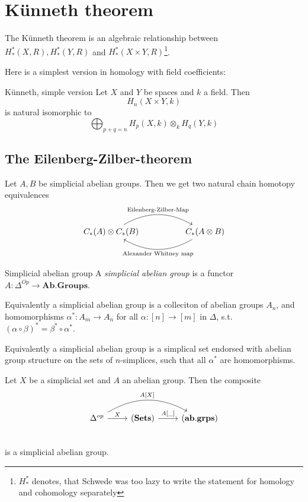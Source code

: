 \documentclass[language=english]{TemplateLecture}
\begin{document}
\section{Künneth theorem}
The Künneth theorem is an algebraic relationship between \(H^*_*(X,R), H^*_*(Y,R)\) and \(H^*_*(X\times Y, R)\)\footnote{\(H_*^*\) denotes, that Schwede was too lazy to write the statement for homology and cohomology separately}.

Here is a simplest version in homology with field coefficients:
\begin{thm}{Künneth, simple version}{}
    Let \(X\) and \(Y\) be spaces and \(k\) a field. Then
    \[H_n(X\times Y, k)\]
    is natural isomorphic to
    \[\bigoplus_{p+q = n} H_p(X,k) \otimes_k H_q(Y,k)\]
\end{thm}

\subsection{The Eilenberg-Zilber-theorem}

Let \(A,B\) be simplicial abelian groups. Then we get two natural chain homotopy equivalences
\[\begin{tikzcd}
    C_*(A) \otimes C_*(B) \ar[rr, bend left, "\text{Eilenberg-Zilber-Map}"] && C_*(A\otimes B) \ar[ll, bend left, "\text{Alexander Whitney map}"]
\end{tikzcd}\]

\begin{defi}{Simplicial abelian group}{}
    A \emph{simplicial abelian group}  is a functor \(A\colon \Delta^{Op} \to \mathbf{Ab.Groups}\).
\end{defi}

\begin{remark}
    Equivalently a simplicial abelian group is a colleciton of abelian groups \(A_n\), and homomorphisms \(\alpha^*\colon A_m \to A_n\) for all \(\alpha\colon [n] \to [m]\) in \(\Delta\), s.t. \((\alpha\circ \beta)^* = \beta^* \circ \alpha^*\).

    Equivalently a simplicial abelian group is a simplical set endorsed with abelian group structure on the sets of \(n\)-simplices, such that all \(\alpha^*\) are homomorphisms.
\end{remark}


\begin{example}
    Let \(X\) be a simplicial set and \(A\) an abelian group. Then the composite
    \[\begin{tikzcd}
        \Delta^{op} \ar[rr, bend left, "{A[X]}"]\ar[r, "X"] & (\mathbf{Sets}) \ar[r, "{{A[\_]}}"] & (\mathbf{ab.grps}) \\
    \end{tikzcd}\]
    is a simplicial abelian group.
\end{example}
\end{document}

